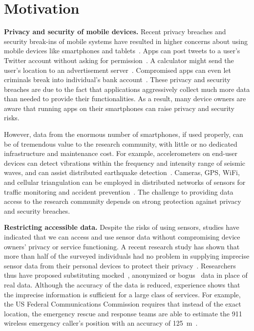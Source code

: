 \section{Motivation}\label{sec-motivation}

\textbf{Privacy and security of mobile devices.}
Recent privacy breaches and security break-ins of mobile systems 
have resulted in higher concerns about using mobile devices like 
smartphones and tablets~\cite{breach}. Apps can post tweets to a 
user's Twitter account without asking for permission~\cite{tweet}. 
A calculator might send the user's location to an advertisement 
server~\cite{calc}. 
Compromised apps can even let criminals break into individual's 
bank account~\cite{starbucks}. These privacy and security breaches 
are due to the fact that applications aggressively collect much more 
data than needed to provide their functionalities.
As a result, many device owners 
are aware that running apps on their smartphones can raise privacy 
and security risks. 

However, data from the enormous number of smartphones, 
if used properly, can be of tremendous value to the research 
community, with little or no dedicated infrastructure and maintenance 
cost. For example, accelerometers on end-user devices can 
detect vibrations within the frequency and intensity range of 
seismic waves, and can assist distributed earthquake 
detection~\cite{faulkner2011next}. Cameras, GPS, WiFi, and 
cellular triangulation can be employed in distributed networks 
of sensors for traffic monitoring and accident 
prevention~\cite{mohan2008nericell, thiagarajan2009vtrack}. 
The challenge to providing data access to the research community
depends on strong protection against privacy and security breaches.

\textbf{Restricting accessible data.}
Despite the risks of using sensors, 
studies have indicated that we can access and use sensor data 
without compromising device owners' privacy or service functioning.
A recent research study has shown that more than half of the 
surveyed individuals had no problem in supplying imprecise 
sensor data from their personal devices to protect their 
privacy~\cite{fawaz2014location}. Researchers thus have proposed 
substituting mocked~\cite{beresford2011mockdroid}, anonymized 
or bogus~\cite{zhou2011taming} data in place of real data. Although
the accuracy of the data is reduced, experience shows
that the imprecise information is sufficient for a large class of 
services. For example, the US Federal Communications Commission requires 
that instead of the exact location, the emergency rescue and 
response teams are able to estimate the 911 wireless emergency 
caller's position with an accuracy of 125~m~\cite{gruteser2003anonymous, 
reed1998overview}. 

